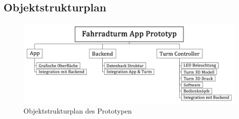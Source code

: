 \subsection{Objektstrukturplan}
\begin{figure}[ht]
  \centering
  \includegraphics[width=1\textwidth]{images/objektstrukturplan_prototyp}
  \caption{Objektstrukturplan des Prototypen}
  \label{fig:objektstrukturplan_prototyp}
\end{figure}